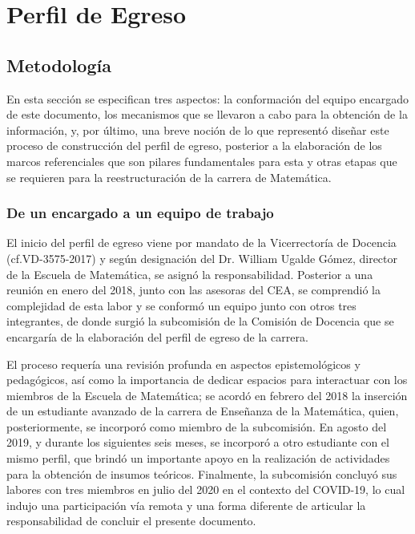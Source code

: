 \chapter{Perfil de Egreso}


\section{Metodología}

En esta sección se especifican tres aspectos: la conformación del equipo encargado de este documento, los mecanismos que se llevaron a cabo para la obtención de la información, y, por último, una breve noción de lo que representó diseñar este proceso de construcción del perfil de egreso, posterior a la elaboración de los marcos referenciales que son pilares fundamentales para esta y otras etapas que se requieren para la reestructuración de la carrera de Matemática. 

\subsection{De un encargado a un equipo de trabajo}

El inicio del perfil de egreso viene por mandato de la Vicerrectoría de Docencia (cf.VD-3575-2017) y según designación del Dr. William Ugalde Gómez, director de la Escuela de Matemática, se asignó la responsabilidad. Posterior a una reunión en enero del 2018, junto con las asesoras del CEA, se comprendió la complejidad de esta labor y se conformó un equipo junto con otros tres integrantes, de donde surgió la subcomisión de la Comisión de Docencia que se encargaría de la elaboración del perfil de egreso de la carrera. 

El proceso requería una revisión profunda en aspectos epistemológicos y pedagógicos, así como la importancia de dedicar espacios para interactuar con los miembros de la Escuela de Matemática; se acordó en febrero del 2018 la inserción de un estudiante avanzado de la carrera de Enseñanza de la Matemática, quien, posteriormente, se incorporó como miembro de la subcomisión. En agosto del 2019, y durante los siguientes seis meses, se incorporó a otro estudiante con el mismo perfil, que brindó un importante apoyo en la realización de actividades para la obtención de insumos teóricos. Finalmente, la subcomisión concluyó sus labores con tres miembros en julio del 2020 en el contexto del COVID-19, lo cual indujo una participación vía remota y una forma diferente de articular la responsabilidad de concluir el presente documento. 

